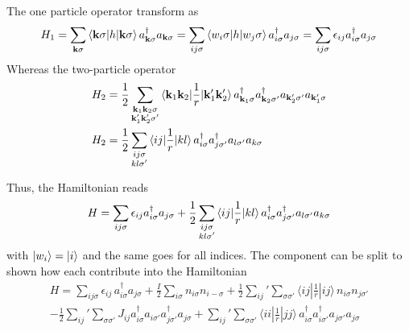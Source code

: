 \documentclass[../../../main.tex]{subfiles}
\begin{document}
The one particle operator transform as
\begin{equation*}
    H_1  =  \sum_{\mathbf{k} \sigma} \braket{ \mathbf{k }\sigma | h | \mathbf{k }\sigma} a^\dagger_{ \mathbf{k} \sigma} a_{ \mathbf{k} \sigma}
    =  \sum_{ij\sigma } \braket{w_i \sigma | h|w_j \sigma }a ^\dagger_{i \sigma} a_{j \sigma}
    =  \sum_{ij \sigma} \epsilon_{ij} a ^\dagger_{i \sigma} a_{j \sigma}
\end{equation*}
Whereas the two-particle operator
\begin{align*}
    H_2 & =  \frac{1}{2}\sum_{\substack{\mathbf{k}_1 \mathbf{k}_2 \sigma                                                        \\ \mathbf{k}_1' \mathbf{k}_2' \sigma'}}
    \braket{ \mathbf{k}_1   \mathbf{k}_2  | \frac{1}{r} |   \mathbf{k}_1' \mathbf{k}_2'   }
    a^\dagger_{ \mathbf{k}_1  \sigma} a^\dagger_{  \mathbf{k}_2  \sigma'} a_{\mathbf{k}_2'  \sigma'}a_{  \mathbf{k}_1'  \sigma} \\
    H_2 & =  \frac{1}{2}\sum_{\substack{i j \sigma                                                                              \\ k l \sigma'}}
    \braket{ i   j  | \frac{1}{r} |   k l   }
    a^\dagger_{ i  \sigma} a^\dagger_{  j  \sigma'} a_{l  \sigma'}a_{  k  \sigma}
\end{align*}

Thus, the Hamiltonian reads
\begin{equation*}
    H =  \sum_{ij \sigma} \epsilon_{ij} a ^\dagger_{i \sigma} a_{j \sigma}  +
    \frac{1}{2}\sum_{\substack{i j \sigma \\ k l \sigma'}}
    \braket{ i   j  | \frac{1}{r} |   k l   }
    a^\dagger_{ i  \sigma} a^\dagger_{  j  \sigma'} a_{l  \sigma'}a_{  k  \sigma}
\end{equation*}
with $\ket{w_i} = \ket{i} $ and the same goes for all indices.
The component can be split to shown how each contribute into the Hamiltonian
\begin{multline*}
    H = \sum_{ij\sigma} \epsilon_{ij}\,a_{i\sigma}^{\dagger}a_{j\sigma}
    + \frac{I}{2}\sum_{i\sigma}n_{i\sigma}n_{i-\sigma}
    + \frac{1}{2}\sum_{ij}^{ }{} '  \sum_{\sigma\sigma'}\langle ij|\frac{1}{r}|ij\rangle\,n_{i\sigma}n_{j\sigma'}\\
    -\frac{1}{2}\sum_{ij}{}' \sum_{\sigma\sigma'}J_{ij}a_{i\sigma}^{\dagger}a_{i\sigma'}a_{j\sigma'}^{\dagger}a_{j\sigma}
    + \sum_{ij} {} ' \sum_{\sigma\sigma'}\langle ii|\frac{1}{r}|jj\rangle\,a_{i\sigma}^{\dagger}a_{i\sigma'}^{\dagger}a_{j\sigma'}a_{j\sigma}
\end{multline*}
\end{document}
